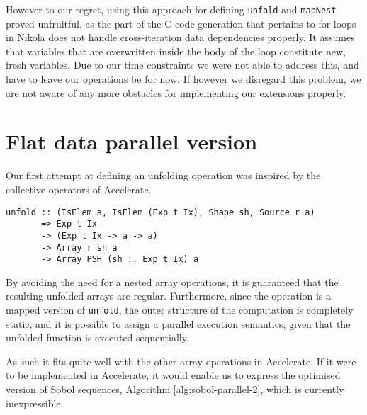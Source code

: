 
However to our regret, using this approach for defining \lstinline{unfold} and
\lstinline{mapNest} proved unfruitful, as the part of the C code generation that
pertains to for-loops in Nikola does not handle cross-iteration data
dependencies properly. It assumes that variables that are overwritten inside
the body of the loop constitute new, fresh variables. Due to our time
constraints we were not able to address this, and have to leave our operations
be for now. If however we disregard this problem, we are not aware of any more
obstacles for implementing our extensions properly.

\section{Flat data parallel version}
Our first attempt at defining an unfolding operation was inspired by the
collective operators of Accelerate.

\begin{lstlisting}
unfold :: (IsElem a, IsElem (Exp t Ix), Shape sh, Source r a)
       => Exp t Ix
       -> (Exp t Ix -> a -> a)
       -> Array r sh a
       -> Array PSH (sh :. Exp t Ix) a
\end{lstlisting}

By avoiding the need for a nested array operations, it is guaranteed
that the resulting unfolded arrays are regular. Furthermore, since the
operation is a mapped version of \lstinline{unfold}, the outer
structure of the computation is completely static, and it is possible
to assign a parallel execution semantics, given that the unfolded
function is executed sequentially.

As such it fits quite well with the other array operations in Accelerate. If it
were to be implemented in Accelerate, it would enable us to express the
optimised version of Sobol sequences, Algorithm \ref{alg:sobol-parallel-2},
which is currently inexpressible.



